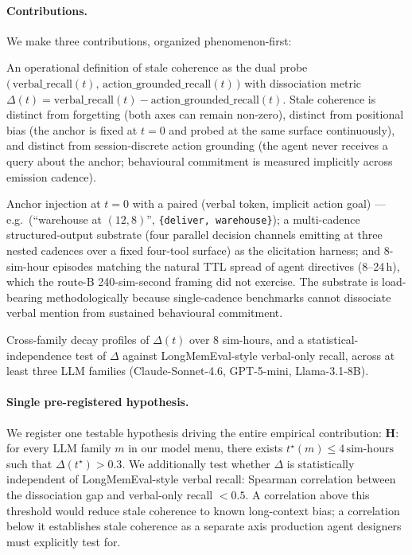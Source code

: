 \paragraph{Contributions.}
We make three contributions, organized phenomenon-first:
\begin{description}[leftmargin=*]
\item[C1 --- Phenomenon.] An operational definition of stale coherence as the
dual probe
$\bigl(\,\text{verbal\_recall}(t),\,\text{action\_grounded\_recall}(t)\,\bigr)$
with dissociation metric
$\Delta(t) = \text{verbal\_recall}(t) - \text{action\_grounded\_recall}(t)$.
Stale coherence is distinct from forgetting (both axes can remain non-zero),
distinct from positional bias (the anchor is fixed at $t = 0$ and probed at
the same surface continuously), and distinct from session-discrete action
grounding (the agent never receives a query about the anchor; behavioural
commitment is measured implicitly across emission cadence).

\item[C2 --- Method.] Anchor injection at $t = 0$ with a paired (verbal token,
implicit action goal) --- e.g.\ (``warehouse at $(12,8)$'',
\texttt{\{deliver,\ warehouse\}}); a multi-cadence structured-output
substrate (four parallel decision channels emitting at three nested cadences
over a fixed four-tool surface) as the elicitation harness; and 8-sim-hour
episodes matching the natural TTL spread of agent directives (8--24\,h),
which the route-B 240-sim-second framing did not exercise. The substrate is
load-bearing methodologically because single-cadence benchmarks cannot
dissociate verbal mention from sustained behavioural commitment.

\item[C3 --- Empirical (camera-ready).] Cross-family decay profiles of
$\Delta(t)$ over 8 sim-hours, and a statistical-independence test of $\Delta$
against LongMemEval-style verbal-only recall, across at least three LLM
families (Claude-Sonnet-4.6, GPT-5-mini, Llama-3.1-8B).
\end{description}

\paragraph{Single pre-registered hypothesis.}
We register one testable hypothesis driving the entire empirical contribution:
\textbf{H}: for every LLM family $m$ in our model menu, there exists
$t^{\star}(m) \leq 4\,\text{sim-hours}$ such that
$\Delta(t^{\star}) > 0.3$. We additionally test whether
$\Delta$ is statistically independent of LongMemEval-style verbal recall:
Spearman correlation between the dissociation gap and verbal-only recall
$< 0.5$. A correlation above this threshold would reduce stale coherence to
known long-context bias; a correlation below it establishes stale coherence as
a separate axis production agent designers must explicitly test for.

